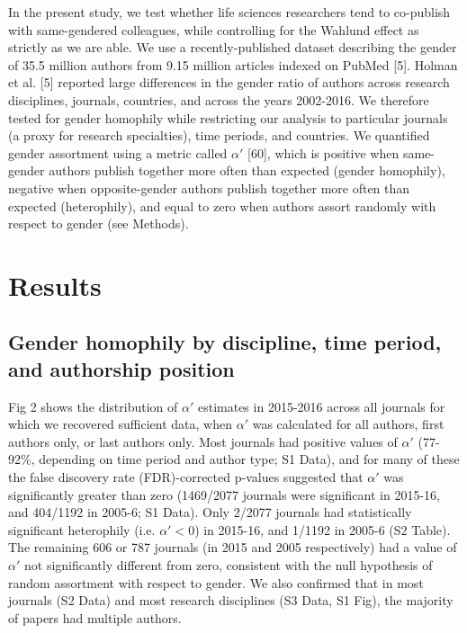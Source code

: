 \documentclass[12pt,]{article}
\begin{document}
In the present study, we test whether life sciences researchers tend to
co-publish with same-gendered colleagues, while controlling for the
Wahlund effect as strictly as we are able. We use a recently-published
dataset describing the gender of 35.5 million authors from 9.15 million
articles indexed on PubMed {[}5{]}. Holman et al. {[}5{]} reported large
differences in the gender ratio of authors across research disciplines,
journals, countries, and across the years 2002-2016. We therefore tested
for gender homophily while restricting our analysis to particular
journals (a proxy for research specialties), time periods, and
countries. We quantified gender assortment using a metric called
\(\alpha'\) {[}60{]}, which is positive when same-gender authors publish
together more often than expected (gender homophily), negative when
opposite-gender authors publish together more often than expected
(heterophily), and equal to zero when authors assort randomly with
respect to gender (see Methods).

\hypertarget{results}{%
\section{Results}\label{results}}

\hypertarget{gender-homophily-by-discipline-time-period-and-authorship-position}{%
\subsection{Gender homophily by discipline, time period, and authorship
position}\label{gender-homophily-by-discipline-time-period-and-authorship-position}}

Fig 2 shows the distribution of \(\alpha'\) estimates in 2015-2016
across all journals for which we recovered sufficient data, when
\(\alpha'\) was calculated for all authors, first authors only, or last
authors only. Most journals had positive values of \(\alpha'\) (77-92\%,
depending on time period and author type; S1 Data), and for many of
these the false discovery rate (FDR)-corrected p-values suggested that
\(\alpha'\) was significantly greater than zero (1469/2077 journals were
significant in 2015-16, and 404/1192 in 2005-6; S1 Data). Only 2/2077
journals had statistically significant heterophily (i.e.
\(\alpha' < 0\)) in 2015-16, and 1/1192 in 2005-6 (S2 Table). The
remaining 606 or 787 journals (in 2015 and 2005 respectively) had a
value of \(\alpha'\) not significantly different from zero, consistent
with the null hypothesis of random assortment with respect to gender. We
also confirmed that in most journals (S2 Data) and most research
disciplines (S3 Data, S1 Fig), the majority of papers had multiple
authors.
\end{document}
